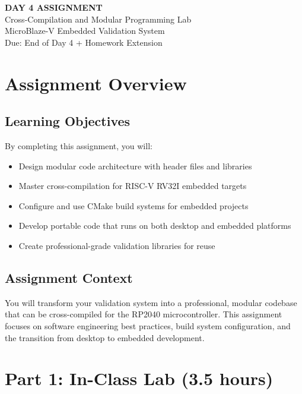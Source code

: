 \documentclass[11pt,a4paper]{article}
\begin{document}
\begin{center}
    {\Huge\bfseries\color{codeblue} DAY 4 ASSIGNMENT}\\[0.5cm]
    {\Large Cross-Compilation and Modular Programming Lab}\\[0.3cm]
    {\large MicroBlaze-V Embedded Validation System}\\[0.2cm]
    {\normalsize Due: End of Day 4 + Homework Extension}
\end{center}

\vspace{1cm}

\section{Assignment Overview}

\subsection{Learning Objectives}
By completing this assignment, you will:
\begin{itemize}
    \item Design modular code architecture with header files and libraries
    \item Master cross-compilation for RISC-V RV32I embedded targets
    \item Configure and use CMake build systems for embedded projects
    \item Develop portable code that runs on both desktop and embedded platforms
    \item Create professional-grade validation libraries for reuse
\end{itemize}

\subsection{Assignment Context}
You will transform your validation system into a professional, modular codebase that can be cross-compiled for the RP2040 microcontroller. This assignment focuses on software engineering best practices, build system configuration, and the transition from desktop to embedded development.

\section{Part 1: In-Class Lab (3.5 hours)}
\end{document}
